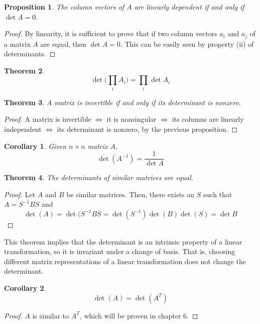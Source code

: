 \documentclass{article}
\newtheorem{theorem}{Theorem}[section]
\newtheorem{proposition}[theorem]{Proposition}
\newtheorem{corollary}{Corollary}[theorem]
\theoremstyle{remark}
\theoremstyle{definition}
\begin{document}
  \begin{proposition}
  The column vectors of $A$ are linearly dependent if and only if $\det{A} = 0$. 
  \end{proposition}
  \begin{proof}
  By linearity, it is sufficient to prove that if two column vectors $a_i$ and $a_j$ of a matrix $A$ are equal, then $\det{A} = 0$. This can be easily seen by property (ii) of determinants. 
  \end{proof}

  \begin{theorem}
  \[ \det{\bigg(\prod_i A_i \bigg)} = \prod_i \det{A_i}\]
  \end{theorem}

  \begin{theorem}
  A matrix is invertible if and only if its determinant is nonzero. 
  \end{theorem}
  \begin{proof}
  A matrix is invertible $\iff$ it is nonsingular $\iff$ its columns are linearly independent $\iff$ its determinant is nonzero, by the previous proposition. 
  \end{proof}

  \begin{corollary}
  Given $n \times n$ matrix $A$,
  \[\det{(A^{-1})} = \frac{1}{\det{A}}\]
  \end{corollary}

  \begin{theorem}
  The determinants of similar matrices are equal. 
  \end{theorem}
  \begin{proof}
  Let $A$ and $B$ be similar matrices. Then, there exists an $S$ such that $A = S^{-1} B S$ and 
  \[ \det{(A)} = \det{(S^{-1} B S} = \det{(S^{-1})} \det{(B)} \det{(S)} = \det{B}\]
  \end{proof}

  This theorem implies that the determinant is an intrinsic property of a linear transformation, so it is invariant under a change of basis. That is, choosing different matrix representations of a linear transformation does not change the determinant.  

  \begin{corollary}
  \[\det{(A)} = \det{(A^T)}\]
  \end{corollary}
  \begin{proof}
  $A$ is similar to $A^T$, which will be proven in chapter 6. 
  \end{proof}
\end{document}
